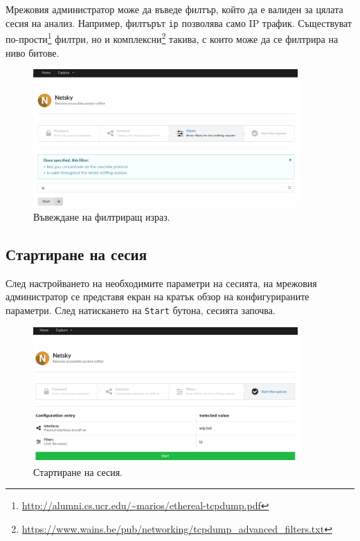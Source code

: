 \documentclass[12pt,a4paper,oneside]{book}
\begin{document}
Мрежовия администратор може да въведе филтър, който да е валиден за цялата сесия
на анализ. Например, филтърът \texttt{ip} позволява само IP трафик. Съществуват
по-прости\footnote{\url{http://alumni.cs.ucr.edu/~marios/ethereal-tcpdump.pdf}}
филтри,
но и
комплексни\footnote{\url{https://www.wains.be/pub/networking/tcpdump_advanced_filters.txt}}
такива, с които може да се филтрира на ниво битове.

\begin{figure}[h!]
  \centering
  \includegraphics[width=0.9\textwidth]{figures/screenshots/filter.png}
  \caption{Въвеждане на филтриращ израз.}
  \label{screenshots_filter_fig}
\end{figure}

\subsection{Стартиране на сесия}

След настройването на необходимите параметри на сесията, на мрежовия
администратор се представя екран на кратък обзор на конфигурираните параметри.
След натискането на \texttt{Start} бутона, сесията започва.

\begin{figure}[h!]
  \centering
  \includegraphics[width=0.9\textwidth]{figures/screenshots/start.png}
  \caption{Стартиране на сесия.}
  \label{screenshots_start_fig}
\end{figure}
\end{document}
